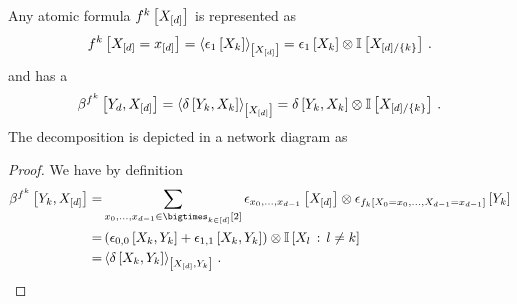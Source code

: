 \begin{lemma}
    \label{lem:atomicFormulaRepresentation}
    Any atomic formula $f^{k}\left[X_{[d]}\right]$ is represented as
    \begin{align*}
        f^{k}\left[X_{[d]}=x_{[d]}\right]
        = \left\langle \epsilon_{1}\left[X_{k}\right]\right\rangle_{\left[ X_{[d]} \right]}
        = \epsilon_{1}\left[X_{k}\right] \otimes \mathbb{I}\left[X_{[d]/\{k\}}\right]  \, .
    \end{align*}
    and has a \basisEncoding{}
    \begin{align*}
        \bencodingofat{\atomicformulaof{\atomenumerator}}{\headvariableof{\atomorder},\shortcatvariables}
        = \contractionof{\identityat{\headvariableof{\atomenumerator},\catvariableof{\atomenumerator}}}{\shortcatvariables}
        = \identityat{\headvariableof{\atomenumerator},\catvariableof{\atomenumerator}} \otimes \onesat{\catvariableof{[\catorder]/\{\atomenumerator\}}} \, .
    \end{align*}
    The decomposition is depicted in a network diagram as
    \begin{center}
        
    \end{center}
\end{lemma}
\begin{proof}
    We have by definition
    \begin{align*}
        \bencodingofat{\atomicformulaof{\atomenumerator}}{\headvariableof{\atomenumerator},\shortcatvariables}
        =& \sum_{\catindices\in\atomstates} \onehotmapofat{\catindices}{\shortcatvariables} \otimes \onehotmapofat{\formulaofat{\atomenumerator}{\indexedcatvariables}}{\headvariableof{\atomenumerator}} \\
        =& \left( \onehotmapofat{0,0}{\catvariableof{\atomenumerator},\headvariableof{\atomenumerator}} +
               \onehotmapofat{1,1}{\catvariableof{\atomenumerator},\headvariableof{\atomenumerator}} \right) \otimes \onesat{\catvariableof{\secatomenumerator} \wcols \secatomenumerator \neq \atomenumerator} \\
        =& \contractionof{\identityat{\catvariableof{\atomenumerator},\headvariableof{\atomenumerator}}}{\shortcatvariables,\headvariableof{\atomenumerator}} \, . \qedhere
    \end{align*}
\end{proof}


